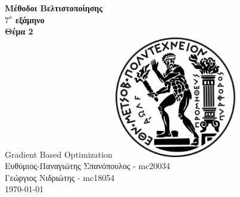 \begin{center}
    \vspace{4cm}
    \huge
    \textbf{Μέθοδοι Βελτιστοποίησης}\\
    \textbf{ {$7^o$} εξάμηνο} \\
    \vspace{1cm}
    \LARGE
    \textbf{Θέμα 2}\\
    \vspace{0.5cm}
    \LARGE
    Gradient Based Optimization     \vfill
    \includegraphics[width=0.4\textwidth]{pyrforos_bw.jpg}\\
    \vspace{4cm}
    \Large
    Ευθύμιος-Παναγιώτης Σπανόπουλος - mc20034\\
    Γεώργιος Νιδριώτης  - mc18054\\

    \today
    \vspace{2cm}
\end{center}
